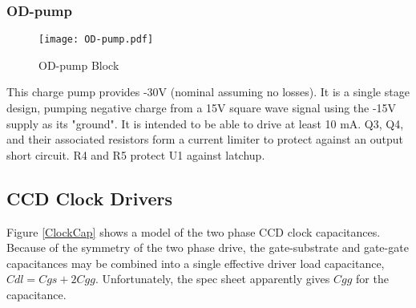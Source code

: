 \documentclass[a4paper,12pt]{article}
\begin{document}


\subsubsection{OD-pump}

   \begin{figure}
   \begin{center}
   \texttt{[image: OD-pump.pdf]}
   \end{center}
   \caption{OD-pump Block}
   \end{figure}
   
This charge pump provides -30V (nominal assuming no losses). It is a single stage design, pumping negative charge from a 15V square wave signal using the -15V supply as its "ground". It is intended to be able to drive at least 10 mA. Q3, Q4, and their associated resistors form a current limiter to protect against an output short circuit. R4 and R5 protect U1 against latchup.






\pagebreak
\subsection{CCD Clock Drivers}
\label{ClockDrivers}
Figure \ref{ClockCap} shows a model of the two phase CCD clock capacitances.  Because of the symmetry of the two phase drive, the gate-substrate and gate-gate capacitances may be combined into a single effective driver load capacitance, $Cdl=Cgs+2Cgg$. Unfortunately, the spec sheet apparently gives $Cgg$ for the capacitance.
\end{document}
